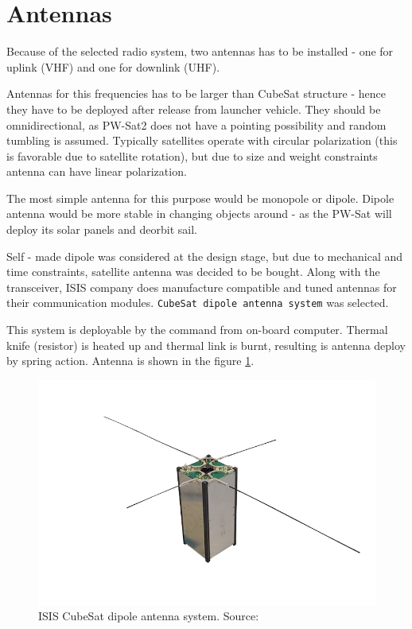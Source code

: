 \section{Antennas}
Because of the selected radio system, two antennas has to be installed - one for uplink (VHF) and one for downlink (UHF).

Antennas for this frequencies has to be larger than CubeSat structure - hence  they have to be deployed after release from launcher vehicle. They should be omnidirectional, as PW-Sat2 does not have a pointing possibility and random tumbling is assumed. Typically satellites operate with circular polarization (this is favorable due to satellite rotation), but due to size and weight constraints antenna can have linear polarization.

The most simple antenna for this purpose would be monopole or dipole. Dipole antenna would be more stable in changing objects around - as the PW-Sat will deploy its solar panels and deorbit sail.

Self - made dipole was considered at the design stage, but due to mechanical and time constraints, satellite antenna was decided to be bought. Along with the transceiver, ISIS company does manufacture compatible and tuned antennas for their communication modules. \texttt{CubeSat dipole antenna system} was selected.

This system is deployable by the command from on-board computer. Thermal knife (resistor) is heated up and thermal link is burnt, resulting is antenna deploy by spring action. Antenna is shown in the figure \ref{ISIS_antenna}.

    \begin{figure}[H]
        \centering
        \includegraphics[width=0.8\paperwidth]{img/2/CubeSat-antenna-dipole-configuration.png}
        \caption{ISIS CubeSat dipole antenna system. Source: \cite{???}}
        \label{ISIS_antenna}
    \end{figure}


